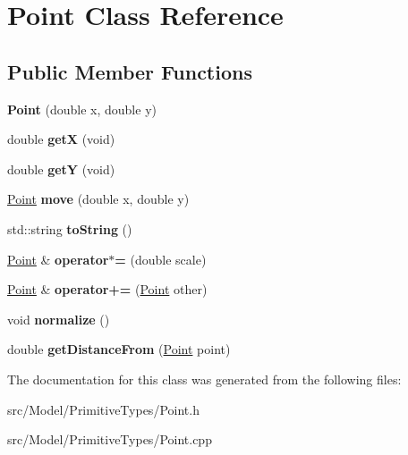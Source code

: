 \hypertarget{classPoint}{}\section{Point Class Reference}
\label{classPoint}
\subsection*{Public Member Functions}
\begin{DoxyCompactItemize}
\item 
{\bfseries Point} (double x, double y)\hypertarget{classPoint_a78b55e8d5466bb8c2cf60fa55f2562ff}{}\label{classPoint_a78b55e8d5466bb8c2cf60fa55f2562ff}

\item 
double {\bfseries getX} (void)\hypertarget{classPoint_a5c2a3ff985c468b81c092a88c0a65e08}{}\label{classPoint_a5c2a3ff985c468b81c092a88c0a65e08}

\item 
double {\bfseries getY} (void)\hypertarget{classPoint_aac9ce26d12b7939db90f6dcddada0633}{}\label{classPoint_aac9ce26d12b7939db90f6dcddada0633}

\item 
\hyperlink{classPoint}{Point} {\bfseries move} (double x, double y)\hypertarget{classPoint_ab9cb5f11593945f16dc48020d084c06d}{}\label{classPoint_ab9cb5f11593945f16dc48020d084c06d}

\item 
std\+::string {\bfseries to\+String} ()\hypertarget{classPoint_a1b3a350eb0e65c9b6605e00134771225}{}\label{classPoint_a1b3a350eb0e65c9b6605e00134771225}

\item 
\hyperlink{classPoint}{Point} \& {\bfseries operator$\ast$=} (double scale)\hypertarget{classPoint_a6ade1a002e021a779f29e10260489500}{}\label{classPoint_a6ade1a002e021a779f29e10260489500}

\item 
\hyperlink{classPoint}{Point} \& {\bfseries operator+=} (\hyperlink{classPoint}{Point} other)\hypertarget{classPoint_af6f0eedaac67abd4f39c0b04d89ce4d4}{}\label{classPoint_af6f0eedaac67abd4f39c0b04d89ce4d4}

\item 
void {\bfseries normalize} ()\hypertarget{classPoint_aef2212b0f31228e803ecbf389bfe7302}{}\label{classPoint_aef2212b0f31228e803ecbf389bfe7302}

\item 
double {\bfseries get\+Distance\+From} (\hyperlink{classPoint}{Point} point)\hypertarget{classPoint_a992b4b44e580a257992bdf88acca7c83}{}\label{classPoint_a992b4b44e580a257992bdf88acca7c83}

\end{DoxyCompactItemize}


The documentation for this class was generated from the following files\+:\begin{DoxyCompactItemize}
\item 
src/\+Model/\+Primitive\+Types/Point.\+h\item 
src/\+Model/\+Primitive\+Types/Point.\+cpp\end{DoxyCompactItemize}
